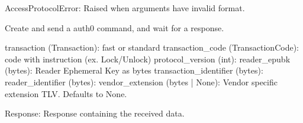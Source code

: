 \documentclass[letterpaper,10pt,english]{sphinxmanual}
\begin{document}
\begin{fulllineitems}
\begin{description}
\sphinxAtStartPar
AccessProtocolError: Raised when arguments have invalid format.

\end{description}

\begin{fulllineitems}
\label{\detokenize{aliro_actuator.access_protocol.reader:aliro_actuator.access_protocol.reader.Reader.command_auth0}}
\pysigstartsignatures
{}
\pysigstopsignatures
\sphinxAtStartPar
Create and send a auth0 command, and wait for a response.
\begin{description}
\sphinxAtStartPar
transaction (Transaction): fast or standard
transaction\_code (TransactionCode): code with instruction (ex. Lock/Unlock)
protocol\_version (int):
reader\_epubk (bytes): Reader Ephemeral Key as bytes
transaction\_identifier (bytes):
reader\_identifier (bytes):
vendor\_extension (bytes | None): Vendor specific extension TLV.
Defaults to None.

\sphinxAtStartPar
Response: Response containing the received data.


\end{description}
\end{fulllineitems}
\end{fulllineitems}
\end{document}
